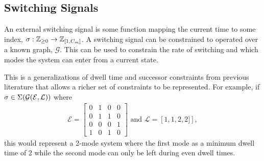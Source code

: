 \subsection{Switching Signals}
An external switching signal is some function mapping the current time to some index, $\ss:\int\rgeq{0}\rightarrow\int\rii{1}{\nummodes}$. A switching signal can be constrained to operated over a known graph, $\mathcal{G}$. This can be used to constrain the rate of switching and which modes the system can enter from a current state.
\begin{remark}
This is a generalizations of dwell time and successor constraints from previous literature that allows a richer set of constraints to be represented. For example, if $\ss\in\Sigma(\mathcal{G}(\mathcal{E},\mathcal{L}))$ where
\begin{align*}
\mathcal{E}=\begin{bmatrix}0&1&0&0\\0&1&1&0\\0&0&0&1\\1&0&1&0\end{bmatrix}\text{ and }
\mathcal{L}=\left[1,1,2,2]\right],
\end{align*}
this would represent a 2-mode system where the first mode as a minimum dwell time of 2 while the second mode can only be left during even dwell times.
\end{remark}

